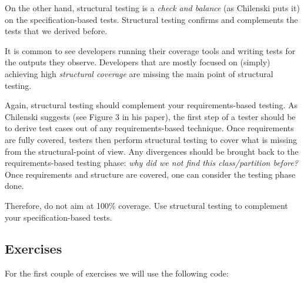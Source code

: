 On the other hand, structural testing is a \emph{check and balance} (as
Chilenski puts it) on the specification-based tests. Structural testing
confirms and complements the tests that we derived before.

It is common to see developers running their coverage tools and writing
tests for the outputs they observe. Developers that are mostly focused
on (simply) achieving high \emph{structural coverage} are missing the
main point of structural testing.

Again, structural testing should complement your requirements-based
testing. As Chilenski suggests (see Figure 3 in his paper), the first
step of a tester should be to derive test cases out of any
requirements-based technique. Once requirements are fully covered,
testers then perform structural testing to cover what is missing from
the structural-point of view. Any divergences should be brought back to
the requirements-based testing phase: \emph{why did we not find this
class/partition before?} Once requirements and structure are covered,
one can consider the testing phase done.

Therefore, do not aim at 100\% coverage. Use structural testing to
complement your specification-based tests.

\hypertarget{exercises}{%
\subsection{Exercises}\label{exercises}}

For the first couple of exercises we will use the following code:

\begin{Shaded}
\begin{Highlighting}[]
  \NormalTok{(}
  \NormalTok{) \{}
    \NormalTok{ (}\NormalTok{) \{}
      \NormalTok{ == }\NormalTok{) \{}
        
         \NormalTok{;}
\NormalTok{         \}}
\NormalTok{       \}}
\NormalTok{  \} }\NormalTok{ \{}
    \NormalTok{ (}\NormalTok{) \{}
      \NormalTok{)) \{}
        
         \NormalTok{;}
\NormalTok{         \}}
\NormalTok{       \}}
\NormalTok{     \}}
   \NormalTok{;}
\NormalTok{\}}
\end{Highlighting}
\end{Shaded}

